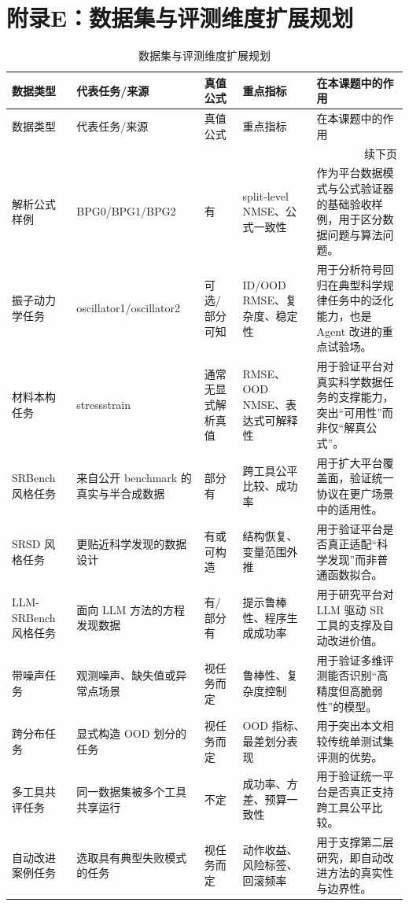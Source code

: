 \documentclass[UTF8,12pt]{ctexart}
\begin{document}
\section{附录E：数据集与评测维度扩展规划}

\small
\begin{longtable}{p{2.2cm}p{3.4cm}p{2.1cm}p{3.0cm}p{4.8cm}}
\caption{数据集与评测维度扩展规划}\label{tab:data-plan}\\
\toprule
数据类型 & 代表任务/来源 & 真值公式 & 重点指标 & 在本课题中的作用 \\
\midrule
\endfirsthead
\toprule
数据类型 & 代表任务/来源 & 真值公式 & 重点指标 & 在本课题中的作用 \\
\midrule
\endhead
\midrule
\multicolumn{5}{r}{续下页}\\
\endfoot
\bottomrule
\endlastfoot
解析公式样例 & BPG0/BPG1/BPG2 & 有 & split-level NMSE、公式一致性 & 作为平台数据模式与公式验证器的基础验收样例，用于区分数据问题与算法问题。 \\
振子动力学任务 & oscillator1/oscillator2 & 可选/部分可知 & ID/OOD RMSE、复杂度、稳定性 & 用于分析符号回归在典型科学规律任务中的泛化能力，也是 Agent 改进的重点试验场。 \\
材料本构任务 & stressstrain & 通常无显式解析真值 & RMSE、OOD NMSE、表达式可解释性 & 用于验证平台对真实科学数据任务的支撑能力，突出“可用性”而非仅“解真公式”。 \\
SRBench 风格任务 & 来自公开 benchmark 的真实与半合成数据 & 部分有 & 跨工具公平比较、成功率 & 用于扩大平台覆盖面，验证统一协议在更广场景中的适用性。 \\
SRSD 风格任务 & 更贴近科学发现的数据设计 & 有或可构造 & 结构恢复、变量范围外推 & 用于验证平台是否真正适配“科学发现”而非普通函数拟合。 \\
LLM-SRBench 风格任务 & 面向 LLM 方法的方程发现数据 & 有/部分有 & 提示鲁棒性、程序生成成功率 & 用于研究平台对 LLM 驱动 SR 工具的支撑及自动改进价值。 \\
带噪声任务 & 观测噪声、缺失值或异常点场景 & 视任务而定 & 鲁棒性、复杂度控制 & 用于验证多维评测能否识别“高精度但高脆弱性”的模型。 \\
跨分布任务 & 显式构造 OOD 划分的任务 & 视任务而定 & OOD 指标、最差划分表现 & 用于突出本文相较传统单测试集评测的优势。 \\
多工具共评任务 & 同一数据集被多个工具共享运行 & 不定 & 成功率、方差、预算一致性 & 用于验证统一平台是否真正支持跨工具公平比较。 \\
自动改进案例任务 & 选取具有典型失败模式的任务 & 视任务而定 & 动作收益、风险标签、回滚频率 & 用于支撑第二层研究，即自动改进方法的真实性与边界性。 \\
\end{longtable}
\normalsize
\end{document}
